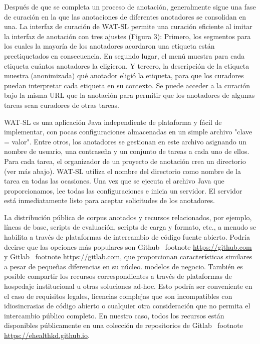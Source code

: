 \begin{description}
Después de que se completa un proceso de anotación, generalmente sigue una fase de curación en la que las anotaciones de diferentes anotadores se consolidan en una. La interfaz de curación de WAT-SL permite una curación eficiente al imitar la interfaz de anotación con tres ajustes (Figura 3): Primero, los segmentos para los cuales la mayoría de los anotadores acordaron una etiqueta están preetiquetados en consecuencia. En segundo lugar, el menú muestra para cada etiqueta cuántos anotadores la eligieron. Y tercero, la descripción de la etiqueta muestra (anonimizada) qué anotador eligió la etiqueta, para que los curadores puedan interpretar cada etiqueta en su contexto. Se puede acceder a la curación bajo la misma URL que la anotación para permitir que los anotadores de algunas tareas sean curadores de otras tareas.

WAT-SL es una aplicación Java independiente de plataforma y fácil de implementar, con pocas configuraciones almacenadas en un simple archivo "clave = valor". Entre otros, los anotadores se gestionan en este archivo asignando un nombre de usuario, una contraseña y un conjunto de tareas a cada uno de ellos. Para cada tarea, el organizador de un proyecto de anotación crea un directorio (ver más abajo). WAT-SL utiliza el nombre del directorio como nombre de la tarea en todas las ocasiones. Una vez que se ejecuta el archivo Java que proporcionamos, lee todas las configuraciones e inicia un servidor. El servidor está inmediatamente listo para aceptar solicitudes de los anotadores.

\end{description}

La distribución pública de corpus anotados y recursos relacionados, por ejemplo, líneas de base, scripts de evaluación, scripts de carga y formato, etc., a menudo se habilita a través de plataformas de intercambio de código fuente abierto.
Podría decirse que las opciones más populares son Github \ footnote {\url{https://github.com}} y Gitlab \ footnote {\url{https://gitlab.com}}, que proporcionan características similares a pesar de pequeñas diferencias en su núcleo. modelos de negocio.
También es posible compartir los recursos correspondientes a través de plataformas de hospedaje institucional u otras soluciones ad-hoc. Esto podría ser conveniente en el caso de requisitos legales, licencias complejas que son incompatibles con idiosincrasias de código abierto o cualquier otra consideración que no permita el intercambio público completo.
En nuestro caso, todos los recursos están disponibles públicamente en una colección de repositorios de Gitlab \ footnote {\url{https://ehealthkd.github.io}}.

